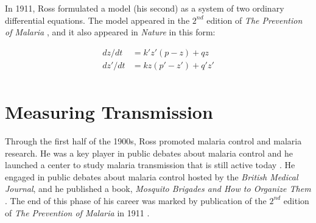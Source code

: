 \documentclass[
]{book}
\begin{document}
In 1911, Ross formulated a model (his second) as a system of two ordinary differential equations. The model appeared in the \(2^{nd}\) edition of \emph{The Prevention of Malaria} \autocite{RossR1911Book}, and it also appeared in \emph{Nature} \autocite{RossR1911Nature} in this form:

\[ 
\begin{array}{rl}
dz/dt &= k' z' (p-z) + q z \\
dz'/dt &= k z (p'-z') + q' z' \\
\end{array}
\]

\section{Measuring Transmission}\label{measuring-transmission}

Through the first half of the 1900s, Ross promoted malaria control and malaria research.
He was a key player in public debates about malaria control and he launched a center to study malaria transmission that is still active today \autocite{BockarieMJ1999ItAll,SmithDL2012_RossMacdonald}.
He engaged in public debates about malaria control hosted by the \emph{British Medical Journal}, and he published a book, \emph{Mosquito Brigades and How to Organize Them} \autocite{RossR1902MosquitoBrigades}.
The end of this phase of his career was marked by publication of the \(2^{nd}\) edition of \emph{The Prevention of Malaria} in 1911 \autocite{RossR1911Book}.
\end{document}
